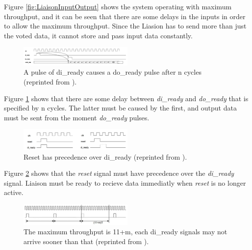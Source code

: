 \documentclass[a4paper]{IEEEtran}
\begin{document}
Figure \ref{fig:LiaisonInputOutput} shows the system operating with maximum throughput, and it can be seen that there are some delays in the inputs in order to allow the maximum throughput.
Since the Liasion has to send more than just the voted data, it cannot store and pass input data constantly.

\begin{figure}[h!]
    \centering
    \includegraphics[width=0.5\textwidth]{Figures/ProjectDescription/LiaisonDiReadyDoReady}
    \caption{A pulse of di\_ready causes a do\_ready pulse after n cycles (reprinted from \protect\cite{assignment-text}).}
    \label{fig:LiaisonDiReadyDoReady}
\end{figure}

Figure \ref{fig:LiaisonDiReadyDoReady} shows that there are some delay between \textit{di\_ready} and \textit{do\_ready} that is specified by n cycles.
The latter must be caused by the first, and output data must be sent from the moment \textit{do\_ready} pulses.

\begin{figure}[h!]
    \centering
    \includegraphics[width=0.5\textwidth]{Figures/ProjectDescription/LiaisonResetDiReady}
    \caption{Reset has precedence over di\_ready (reprinted from \protect\cite{assignment-text}).}
    \label{fig:LiaisonResetDiReady}
\end{figure}

Figure \ref{fig:LiaisonResetDiReady} shows that the \textit{reset} signal must have precedence over the \textit{di\_ready} signal. Liaison must be ready to recieve data immediatly when \textit{reset} is no longer active.

\begin{figure}[h!]
    \centering
    \includegraphics[width=0.5\textwidth]{Figures/ProjectDescription/LiaisonMaxThroughput}
    \caption{The maximum throughput is 11+m, each di\_ready signals may not arrive sooner than that (reprinted from \protect\cite{assignment-text}).}
    \label{fig:LiaisonMaxThroughput}
\end{figure}
\end{document}
